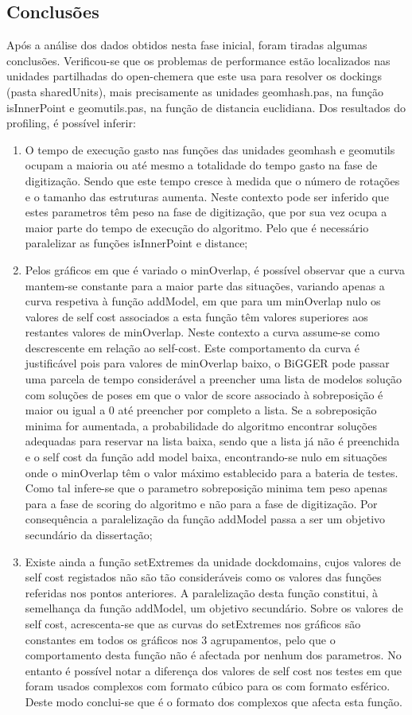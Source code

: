 \subsection{Conclusões}
Após a análise dos dados obtidos nesta fase inicial, foram tiradas algumas conclusões. Verificou-se que os problemas de performance estão localizados nas unidades partilhadas do open-chemera que este usa para resolver os dockings (pasta sharedUnits), mais precisamente as unidades geomhash.pas, na função isInnerPoint e geomutils.pas, na função de distancia euclidiana.
Dos resultados do profiling, é possível inferir:
\begin{enumerate}
	\item{O tempo de execução gasto nas funções das unidades geomhash e geomutils ocupam a maioria ou até mesmo a totalidade do tempo gasto na fase de digitização. Sendo que este tempo cresce à medida que o número de rotações e o tamanho das estruturas aumenta. Neste contexto pode ser inferido que estes parametros têm peso na fase de digitização, que por sua vez ocupa a maior parte do tempo de execução do algoritmo. Pelo que é necessário paralelizar as funções isInnerPoint e distance;}
	\item{Pelos gráficos em que é variado o minOverlap, é possível observar que a curva mantem-se constante para a maior parte das situações, variando apenas a curva respetiva à função addModel, em que para um minOverlap nulo os valores de self cost associados a esta função têm valores superiores aos restantes valores de minOverlap. Neste contexto a curva assume-se como descrescente em relação ao self-cost. Este comportamento da curva é justificável pois para valores de minOverlap baixo, o BiGGER pode passar uma parcela de tempo considerável a preencher uma lista de modelos solução com soluções de poses em que o valor de score associado à sobreposição é maior ou igual a 0 até preencher por completo a lista. Se a sobreposição minima for aumentada, a probabilidade do algoritmo encontrar soluções adequadas para reservar na lista baixa, sendo que a lista já não é preenchida e o self cost da função add model baixa, encontrando-se nulo em situações onde o minOverlap têm o valor máximo establecido para a bateria de testes. Como tal infere-se que o parametro sobreposição minima tem peso apenas para a fase de scoring do algoritmo e não para a fase de digitização. Por consequência a paralelização da função addModel passa a ser um objetivo secundário da dissertação; }
	\item{Existe ainda a função setExtremes da unidade dockdomains, cujos valores de self cost registados não são tão consideráveis como os valores das funções referidas nos pontos anteriores. A paralelização desta função constitui, à semelhança da função addModel, um objetivo secundário. Sobre os valores de self cost, acrescenta-se que as curvas do setExtremes nos gráficos são constantes em todos os gráficos nos 3 agrupamentos, pelo que o comportamento desta função não é afectada por nenhum dos parametros. No entanto é possível notar a diferença dos valores de self cost nos testes em que foram usados complexos com formato cúbico para os com formato esférico. Deste modo conclui-se que é o formato dos complexos que afecta esta função. }

\end{enumerate}
